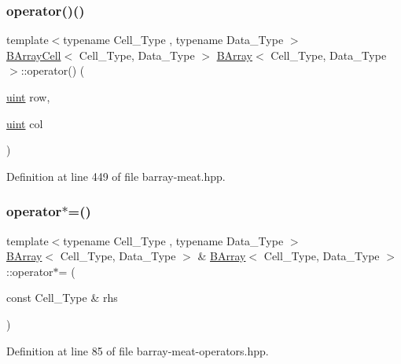 \subsubsection{\texorpdfstring{operator()()}{operator()()}}
{\footnotesize\ttfamily template$<$typename Cell\+\_\+\+Type , typename Data\+\_\+\+Type $>$ \\
\hyperlink{class_b_array_cell}{B\+Array\+Cell}$<$ Cell\+\_\+\+Type, Data\+\_\+\+Type $>$ \hyperlink{class_b_array}{B\+Array}$<$ Cell\+\_\+\+Type, Data\+\_\+\+Type $>$\+::operator() (\begin{DoxyParamCaption}\item[{\hyperlink{typedefs_8hpp_a91ad9478d81a7aaf2593e8d9c3d06a14}{uint}}]{row,  }\item[{\hyperlink{typedefs_8hpp_a91ad9478d81a7aaf2593e8d9c3d06a14}{uint}}]{col }\end{DoxyParamCaption})\hspace{0.3cm}{\ttfamily [inline]}}



Definition at line 449 of file barray-\/meat.\+hpp.

\mbox{\label{class_b_array_a614ae954b9094ff4934f0d81002f8ddb}} 
\subsubsection{\texorpdfstring{operator$\ast$=()}{operator*=()}}
{\footnotesize\ttfamily template$<$typename Cell\+\_\+\+Type , typename Data\+\_\+\+Type $>$ \\
\hyperlink{class_b_array}{B\+Array}$<$ Cell\+\_\+\+Type, Data\+\_\+\+Type $>$ \& \hyperlink{class_b_array}{B\+Array}$<$ Cell\+\_\+\+Type, Data\+\_\+\+Type $>$\+::operator$\ast$= (\begin{DoxyParamCaption}\item[{const Cell\+\_\+\+Type \&}]{rhs }\end{DoxyParamCaption})\hspace{0.3cm}{\ttfamily [inline]}}



Definition at line 85 of file barray-\/meat-\/operators.\+hpp.

\mbox{\label{class_b_array_a706ee6da2f9a232970d286ccdd944d50}} 

